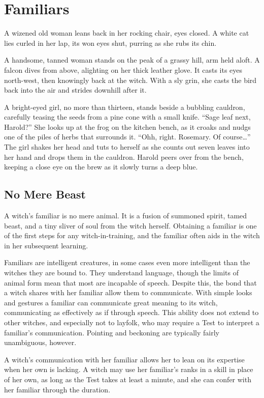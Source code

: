 \chapter{Familiars}

A wizened old woman leans back in her rocking chair, eyes closed.
A white cat lies curled in her lap, its won eyes shut, purring as she rubs its chin.

A handsome, tanned woman stands on the peak of a grassy hill, arm held aloft.
A falcon dives from above, alighting on her thick leather glove.
It casts its eyes north-west, then knowingly back at the witch.
With a sly grin, she casts the bird back into the air and strides downhill after it.

A bright-eyed girl, no more than thirteen, stands beside a bubbling cauldron, carefully teasing the seeds from a pine cone with a small knife.
``Sage leaf next, Harold?''
She looks up at the frog on the kitchen bench, as it croaks and nudgs one of the piles of herbs that surrounds it.
``Ohh, right. Rosemary. Of course\dots''
The girl shakes her head and tuts to herself as she counts out seven leaves into her hand and drops them in the cauldron.
Harold peers over from the bench, keeping a close eye on the brew as it slowly turns a deep blue.

\section{No Mere Beast}

A witch's familiar is no mere animal.
It is a fusion of summoned spirit, tamed beast, and a tiny sliver of soul from the witch herself.
Obtaining a familiar is one of the first steps for any witch-in-training, and the familiar often aids in the witch in her subsequent learning.

Familiars are intelligent creatures, in some cases even more intelligent than the witches they are bound to.
They understand language, though the limits of animal form mean that most are incapable of speech.
Despite this, the bond that a witch shares with her familiar allow them to communicate.
With simple looks and gestures a familiar can communicate great meaning to its witch, communicating as effectively as if through speech.
This ability does not extend to other witches, and especially not to layfolk, who may require a Test to interpret a familiar's communication.
Pointing and beckoning are typically fairly unambiguous, however.

A witch's communication with her familiar allows her to lean on its expertise when her own is lacking.
A witch may use her familiar's ranks in a skill in place of her own, as long as the Test takes at least a minute, and she can confer with her familiar through the duration.

